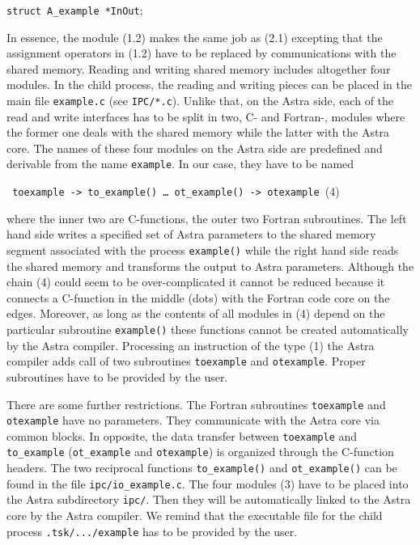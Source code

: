 \documentclass[12pt]{article}
\newcommand{\tw}[1]{\texttt{#1}}
\begin{document}
\tw{struct A\_example *InOut};

In essence, the module (1.2) makes the same job as (2.1) excepting that the
assignment operators in (1.2) have to be replaced by communications with the  
shared memory.
Reading and writing shared memory includes altogether four modules.
In the child process, the reading and writing pieces can be placed
in the main file \tw{example.c} (see \tw{IPC/*.c}).
Unlike that, on the Astra side, each of the read and write interfaces has to
be split in two, C- and Fortran-, modules where the former one deals with the
shared memory while the latter with the Astra core.
The names of these four modules on the Astra side are predefined and derivable
from the name 
\tw{example}. 
In our case, they have to be named 

\vskip5pt\centerline{\hfill\tw{
toexample -> to\_example() \dots\ ot\_example() -> otexample
}\hfill(4)}

where the inner two are C-functions, the outer two Fortran subroutines.
The left hand side writes a specified set of Astra parameters to the shared
memory segment associated with the process \tw{example()} while the right hand
side reads the shared memory and transforms the output to Astra parameters.
Although the chain (4) could seem to be over-complicated it cannot be reduced
because it connects a C-function in the middle (dots) with the Fortran code
core on the edges.
Moreover, as long as the contents of all modules in (4) depend on the
particular subroutine \tw{example()} these functions cannot be created
automatically by the Astra compiler. 
Processing an instruction of the type (1) the Astra compiler adds call of two
subroutines \tw{toexample} and \tw{otexample}. 
Proper subroutines have to be provided by the user.

There are some further restrictions.
The Fortran subroutines \tw{toexample} and \tw{otexample} have no parameters.
They communicate with the Astra core via common blocks.
In opposite, the data transfer between \tw{toexample} and \tw{to\_example} 
(\tw{ot\_example} and \tw{otexample}) is organized through the C-function
headers. 
The two reciprocal functions \tw{to\_example()} and 
\tw{ot\_example()} can be found in the file \tw{ipc/io\_example.c}. 
The four modules (3) have to be placed into the Astra subdirectory \tw{ipc/}. 
Then they will be automatically linked to the Astra core by the Astra compiler.
We remind that the executable file for the child process \tw{.tsk/.../example}
has to be provided by the user.
\end{document}
